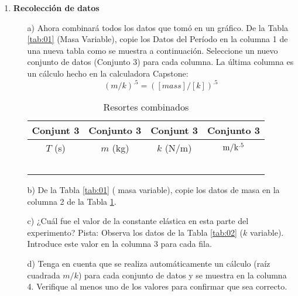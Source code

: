 \documentclass[9pt,a4paper,twocolumn,twoside]{tau-class/tau}
\begin{document}
\begin{enumerate}
    \item \textbf{Recolección de datos}
        \begin{itemize}
            \item [a)]  Ahora combinará todos los datos que tomó en un gráfico. De la Tabla  \textcolor{blue}{\ref{tab:01}} (Masa Variable), copie los Datos del Período en la columna 1 de una nueva tabla como se muestra a continuación. Seleccione un nuevo conjunto de datos (Conjunto 3) para cada columna. La última columna es un cálculo hecho en la calculadora Capstone: 
            \begin{equation}
                 (m/k)^.5 =([mass]/[k ])^.5 
            \end{equation}
            \begin{table}[htbp]
                    \centering
                    \hfill
                    \begin{tabular}{|c|c|c|c|}
                    \hline
                         Conjunt 3 & Conjunto 3 & Conjunt 3 & Conjunto 3  \\ \hline
                         $T$ (s) & $m$ (kg) &  $k$ (N/m)& $\rm m/k^{.5}$ \\\hline
                         &&& \\\hline
                         &&& \\\hline
                         &&& \\\hline
                         &&& \\\hline
                         &&& \\\hline
                    \end{tabular}
                    \caption{ Resortes combinados}
                    \label{tab:03}
                \end{table}
            \item [b)]  De  la  Tabla  \textcolor{blue}{\ref{tab:01}}  (  masa variable),  copie  los  datos  de  masa  en  la  columna  2  de  la  Tabla  \textcolor{blue}{\ref{tab:03}}.
            \item [c)]    ¿Cuál  fue  el  valor  de  la  constante  elástica  en  esta  parte  del  experimento?  Pista:  Observa  los  datos  de  la  Tabla  \textcolor{blue}{\ref{tab:02}}  ($k$ variable).  Introduce  este  valor  en  la  columna  3  para  cada  fila.
            \item [d)]  Tenga  en  cuenta  que  se  realiza  automáticamente  un  cálculo  (raíz  cuadrada  $m/k$)  para  cada  conjunto  de  datos  y  se  muestra  en  la  columna  4.  Verifique  al  menos  uno  de  los  valores  para  confirmar  que  sea correcto.

\end{itemize}
\end{enumerate}
\end{document}
